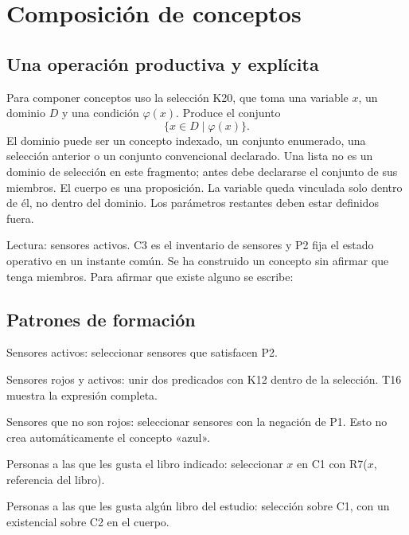 \section{Composición de conceptos}\label{sec:composicion}

\subsection{Una operación productiva y explícita}
Para componer conceptos uso la selección K20, que toma una variable \(x\), un dominio \(D\) y
una condición \(\varphi(x)\). Produce el conjunto
\[
  \{x\in D\mid\varphi(x)\}.
\]
El dominio puede ser un concepto indexado, un conjunto enumerado, una selección
anterior o un conjunto convencional declarado. Una lista no es un dominio de
selección en este fragmento; antes debe declararse el conjunto de sus miembros.
El cuerpo es una proposición. La variable queda vinculada solo dentro de él,
no dentro del dominio. Los parámetros restantes deben estar definidos fuera.

Lectura: sensores activos. C3 es el inventario de sensores y P2 fija el estado
operativo en un instante común. Se ha construido un concepto sin afirmar que
tenga miembros. Para afirmar que existe alguno se escribe:

\subsection{Patrones de formación}
\begin{description}[style=nextline]
\item[Base más propiedad.] Sensores activos: seleccionar sensores que satisfacen P2.
\item[Dos condiciones.] Sensores rojos y activos: unir dos predicados con K12 dentro
de la selección. T16 muestra la expresión completa.
\item[Exclusión dentro de un dominio.] Sensores que no son rojos: seleccionar
sensores con la negación de P1. Esto no crea automáticamente el concepto «azul».
\item[Restricción por relación.] Personas a las que les gusta el libro indicado:
seleccionar \(x\) en C1 con R7(\(x\), referencia del libro).
\item[Restricción cuantificada.] Personas a las que les gusta algún libro del
estudio: selección sobre C1, con un existencial sobre C2 en el cuerpo.
\end{description}

